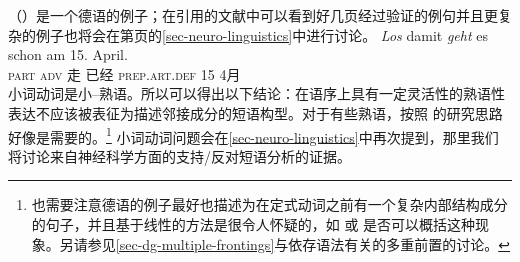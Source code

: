 \begin{exe}
\begin{xlist}[iv.]
\begin{exe}
\begin{xlist}[iv.]
（）是一个德语的例子；在引用的文献中可以看到好几页经过验证的例句并且更复杂的例子也将会在第\pageref{ex-complex-vf}页的\ref{sec-neuro-linguistics}中进行讨论。
\ea\label{bsp-los-damit-zwei}
\gll \emph{Los} damit \emph{geht} es schon am 15. April.\footnotemark\\
      \textsc{part} \textsc{adv} 走 \expl{} 已经 \textsc{prep}.\textsc{art}.\textsc{def} 15 4月\\%
%
\z
小词动词是小--熟语。所以可以得出以下结论：在语序上具有一定灵活性的熟语性表达不应该被表征为描述邻接成分的短语构型。对于有些熟语，按照 的研究思路好像是需要的。\footnote{也需要注意德语的例子最好也描述为在定式动词之前有一个复杂内部结构成分的句子，并且基于线性的方法是很令人怀疑的，如 或 是否可以概括这种现象。另请参见\ref{sec-dg-multiple-frontings}与依存语法有关的多重前置的讨论。
}
小词动词问题会在\ref{sec-neuro-linguistics}中再次提到，那里我们将讨论来自神经科学方面的支持/反对短语分析的证据。


\end{xlist}
\end{exe}
\end{xlist}
\end{exe}
